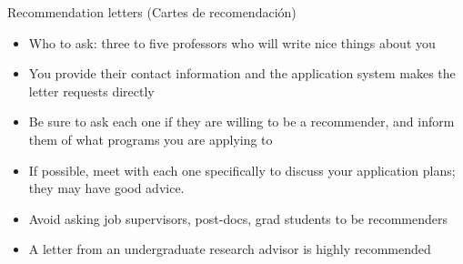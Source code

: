 \begin{frame}[fragile]{Recommendation letters \textcolor{yellow!80!black}{(Cartes de recomendaci\'on)}}
    \begin{itemize}
        \item Who to ask: three to five professors who will write nice things about you 
        \item You provide their contact information and the application system makes the letter requests directly
        \item Be sure to ask each one if they are willing to be a recommender, and inform them of what programs you are applying to
        \item If possible, meet with each one specifically to discuss your application plans; they may have good advice.
        \item Avoid asking job supervisors, post-docs, grad students to be recommenders
        \item A letter from an undergraduate research advisor is highly recommended
    \end{itemize}
\end{frame}

